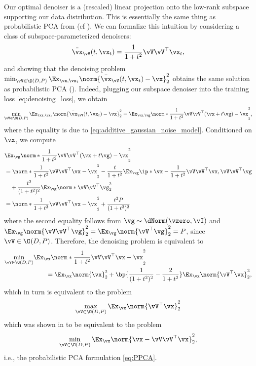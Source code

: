 \documentclass[../../book-main.tex]{subfiles}
\begin{document}
Our optimal denoiser is a (rescaled) linear projection onto the low-rank subspace supporting our data distribution. This is essentially the same thing as probabilistic PCA from  (cf ). We can formalize this intuition by considering a class of subspace-parameterized denoisers:
\begin{equation}\label{eq:optimal nn}
	\bar{\vx}_{\vV}(t, \vx_{t}) = \frac{1}{1 + t^{2}}\vV\vV^{\top}\vx_{t},
\end{equation}
and showing that the denoising problem \(\min_{\vV \in \O(D, P)}\Ex_{\vx, \vx_{t}}\norm{\bar{\vx}_{\vV}(t, \vx_{t}) - \vx}_{2}^{2}\) obtains the same solution as probabilistic PCA (). Indeed, plugging our subspace denoiser into the training loss \eqref{eq:denoising_loss}, we obtain
\begin{equation}
	\min_{\vV \in \O(D, P)}\Ex_{\vx, \vx_{t}}\norm{\bar{\vx}_{\vV}(t, \vx_{t}) - \vx}_{2}^{2} = \Ex_{\vx, \vg}\norm*{\frac{1}{1 + t^{2}}\vV\vV^{\top}(\vx + t\vg) - \vx}_{2}^{2},
\end{equation}
where the equality is due to \eqref{eq:additive_gaussian_noise_model}. Conditioned on \(\vx\), we compute 
\begin{align}
  & \Ex_{\vg}\norm*{\frac{1}{1 + t^{2}}\vV\vV^{\top}(\vx + t\vg) - \vx}_{2}^{2} \\
  &= \norm*{\frac{1}{1 + t^{2}}\vV\vV^{\top}\vx - \vx}_{2}^{2} - \frac{t}{1+t^2}\Ex_{\vg} \ip*{\vx - \frac{1}{1 + t^{2}}\vV\vV^{\top}\vx ,  \vV\vV^{\top}\vg} \notag \\
  &\quad + \frac{t^2}{(1+t^2)^2} \Ex_{\vg}\norm*{\vV\vV^{\top} \vg}_{2}^{2} \\
  &= \norm*{\frac{1}{1 + t^{2}}\vV\vV^{\top}\vx - \vx}_{2}^{2} + \frac{t^2P}{(1+t^2)^2} 
\end{align}
where the second equality follows from \(\vg \sim \dNorm(\vzero, \vI)\) and \( \Ex_{\vg}\norm{\vV\vV^\top \vg}_{2}^{2} = \Ex_{\vg}\norm{\vV^\top \vg}_{2}^{2} = P\), since \(\vV \in \O(D, P)\). Therefore, the denoising problem is equivalent to 
\begin{align}
	\min_{\vV \in \O(D, P)} & \Ex_{\vx} \norm*{\frac{1}{1 + t^{2}}\vV\vV^{\top}\vx - \vx}_{2}^{2} \\ 
	& \qquad = \Ex_{\vx}\norm{\vx}_{2}^{2} + \bp{\frac{1}{(1 + t^{2})^{2}} - \frac{2}{1 + t^{2}}}\Ex_{\vx}\norm{\vV^{\top}\vx}_{2}^{2},
\end{align}
which in turn is equivalent to the problem
\begin{equation}\label{eq:PCA}
    \max_{\vV \in \O(D, P)}\Ex_{\vx}\norm{\vV^{\top}\vx}_{2}^{2}
\end{equation}
which was shown in  to be equivalent to the problem 
\begin{equation}
    \min_{\vV \in \O(D, P)}\Ex_{\vx}\norm{\vx - \vV\vV^{\top}\vx}_{2}^{2},
\end{equation}
i.e., the probabilistic PCA formulation \eqref{eq:PPCA}.
\end{document}
